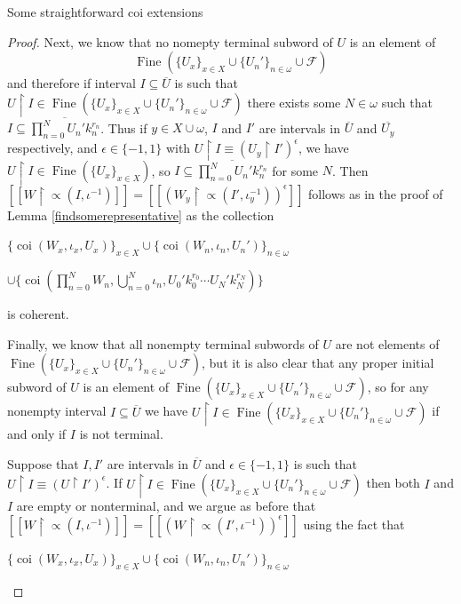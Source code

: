 \documentclass{amsart}
\theoremstyle{definition}\newtheorem{theorem}{Theorem}
\theoremstyle{definition}\newtheorem*{A}{Main Theorem}
\theoremstyle{definition}\newtheorem*{B}{Theorem \ref{elementaryequiv}}
\theoremstyle{definition}\newtheorem*{C}{Theorem \ref{continuous}}
\theoremstyle{definition}\newtheorem*{D}{Theorem \ref{bigisomorphism2}}
\theoremstyle{definition}\newtheorem{bigtheorem}{Main Theorem}
\numberwithin{theorem}{section}
\theoremstyle{definition}\newtheorem{corollary}[theorem]{Corollary}
\theoremstyle{definition}\newtheorem{proposition}[theorem]{Proposition}
\theoremstyle{definition}\newtheorem{definition}[theorem]{Definition}
\theoremstyle{definition}\newtheorem{question}[theorem]{Question}
\theoremstyle{definition}\newtheorem{example}[theorem]{Example}
\theoremstyle{definition}\newtheorem{remark}[theorem]{Remark}
\theoremstyle{definition}\newtheorem{note}[theorem]{Note}
\theoremstyle{definition}\newtheorem{lemma}[theorem]{Lemma}
\theoremstyle{definition}\newtheorem{fact}[theorem]{Fact}
\theoremstyle{definition}\newtheorem{define}[theorem]{Definition}
\theoremstyle{definition}\newtheorem{claim}[theorem]{Claim}
\theoremstyle{definition}\newtheorem{obs}[theorem]{Observation}
\theoremstyle{definition}\newtheorem{definitions}[theorem]{Definitions}
\newcommand{\Fine}{\operatorname{Fine}}
\newcommand{\coi}{\operatorname{coi}}
\begin{document}
\begin{section}{Some straightforward coi extensions}
\begin{proof}
Next, we know that no nomepty terminal subword of $U$ is an element of $$\Fine(\{U_x\}_{x \in X} \cup \{U_n'\}_{n \in \omega} \cup \mathcal{F})$$ and therefore if interval $I \subseteq \overline{U}$ is such that $U \upharpoonright I \in \Fine(\{U_x\}_{x \in X} \cup \{U_n'\}_{n \in \omega} \cup \mathcal{F})$ there exists some $N \in \omega$ such that $I \subseteq \overline{\prod_{n = 0}^N U_n'k_n^{r_n}}$.  Thus if $y \in X \cup \omega$, $I$ and $I'$ are intervals in $\overline{U}$ and $\overline{U_y}$ respectively, and $\epsilon \in \{-1, 1\}$ with $U \upharpoonright I \equiv (U_y \upharpoonright I')^{\epsilon}$, we have $U \upharpoonright I \in \Fine(\{U_x\}_{x \in X})$, so $I \subseteq \overline{\prod_{n = 0}^N U_n'k_n^{r_n}}$ for some $N$.  Then $[[W \upharpoonright \varpropto(I, \iota^{-1})]] = [[(W_y\upharpoonright \varpropto(I', \iota_y^{-1}))^{\epsilon}]]$ follows as in the proof of Lemma \ref{findsomerepresentative} as the collection 

\begin{center}
$\{\coi(W_x, \iota_x, U_x)\}_{x \in X} \cup \{\coi(W_n, \iota_n, U_n')\}_{n \in \omega}$

 $\cup \{\coi(\prod_{n = 0}^NW_n, \bigcup_{n = 0}^N \iota_n , U_0'k_0^{r_0}\cdots U_N'k_N^{r_N})\}$
\end{center}

\noindent is coherent.

Finally, we know that all nonempty terminal subwords of $U$ are not elements of $\Fine(\{U_x\}_{x \in X} \cup \{U_n'\}_{n \in \omega} \cup \mathcal{F})$, but it is also clear that any proper initial subword of $U$ is an element of $\Fine(\{U_x\}_{x \in X} \cup \{U_n'\}_{n \in \omega} \cup \mathcal{F})$, so for any nonempty interval $I \subseteq \overline{U}$ we have $U \upharpoonright I \in \Fine(\{U_x\}_{x \in X} \cup \{U_n'\}_{n \in \omega} \cup \mathcal{F})$ if and only if $I$ is not terminal.


Suppose that $I, I'$ are intervals in $\overline{U}$ and $\epsilon \in \{-1, 1\}$ is such that $U \upharpoonright I \equiv (U \upharpoonright I')^{\epsilon}$.  If $U \upharpoonright I \in \Fine(\{U_x\}_{x \in X} \cup \{U_n'\}_{n \in \omega} \cup \mathcal{F})$ then both $I$ and $I$ are empty or nonterminal, and we argue as before that $[[W \upharpoonright \varpropto(I, \iota^{-1})]] = [[(W \upharpoonright \varpropto(I', \iota^{-1}))^{\epsilon}]]$ using the fact that 

\begin{center}
$\{\coi(W_x, \iota_x, U_x)\}_{x \in X} \cup \{\coi(W_n, \iota_n, U_n')\}_{n \in \omega}$


\end{center}
\end{proof}
\end{section}
\end{document}
